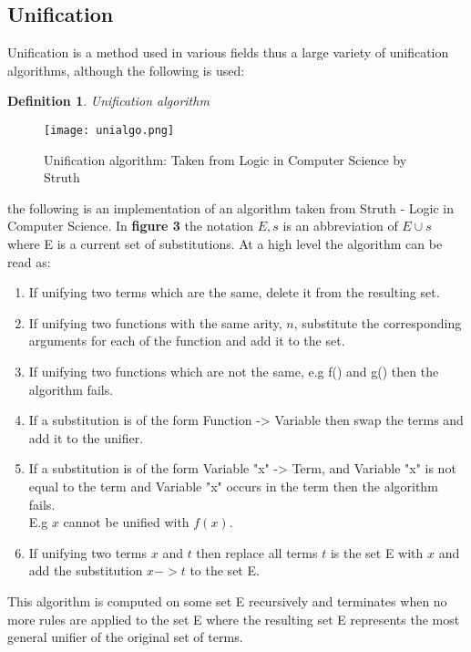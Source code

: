 \documentclass{article}%
\newtheorem{definition}{Definition}
\begin{document}
\subsection{Unification}
Unification is a method used in various fields thus a large variety of unification algorithms, although the following is used:
\begin{definition}
Unification algorithm
\end{definition}
\begin{figure}[h!]
\centering
\texttt{[image: unialgo.png]}
\caption{Unification algorithm: Taken from Logic in Computer Science by Struth} \cite{struth_2019}
\label{fig:unification algorithm}
\end{figure}
the following is an implementation of an algorithm taken from Struth - Logic in Computer Science. \cite{struth_2019}
In \textbf{figure 3} the notation $E,s$ is an abbreviation of $E \cup s$ where E is a current set of substitutions.
At a high level the algorithm can be read as: 
\begin{enumerate}
\item If unifying two terms which are the same, delete it from the resulting set. 
\item If unifying two functions with the same arity, $n$, substitute the corresponding arguments for each of the function and add it to the set.
\item If unifying two functions which are not the same, e.g f() and g() then the algorithm fails.
\item If a substitution is of the form Function -> Variable then swap the terms and add it to the unifier.
\item If a substitution is of the form Variable "x" -> Term, and Variable "x" is not equal to the term and Variable "x" occurs in the term then the algorithm fails. \\
E.g $x$ cannot be unified with $f(x)$. 
\item If unifying two terms $x$ and $t$ then replace all terms $t$ is the set E with $x$ and add the substitution $x -> t$ to the set E. 
\end{enumerate}
This algorithm is computed on some set E recursively and terminates when no more rules are applied to the set E where the resulting set E represents the most general unifier of the original set of terms. 
\end{document}
